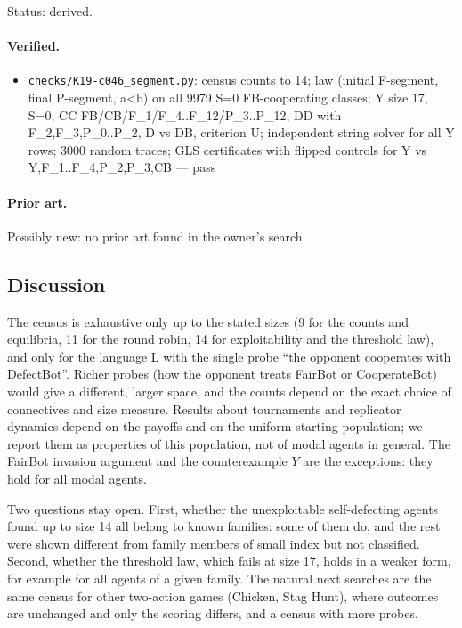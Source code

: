 \documentclass{article}
\begin{document}
Status: derived.

\paragraph{Verified.}
\begin{itemize}
\item \texttt{checks/K19-c046\_segment.py}: census counts to 14; law (initial F-segment, final P-segment, a\textless{}b) on all 9979 S=0 FB-cooperating classes; Y size 17, S=0, CC FB/CB/F\_1/F\_4..F\_12/P\_3..P\_12, DD with F\_2,F\_3,P\_0..P\_2, D vs DB, criterion U; independent string solver for all Y rows; 3000 random traces; GLS certificates with flipped controls for Y vs Y,F\_1..F\_4,P\_2,P\_3,CB --- pass
\end{itemize}

\paragraph{Prior art.} Possibly new: no prior art found in the owner's search.

\subsection*{Discussion}

The census is exhaustive only up to the stated sizes (9 for the counts and equilibria, 11 for
the round robin, 14 for exploitability and the threshold law), and only for the language L with
the single probe ``the opponent cooperates with DefectBot''. Richer probes (how the opponent
treats FairBot or CooperateBot) would give a different, larger space, and the counts depend on
the exact choice of connectives and size measure. Results about tournaments and replicator
dynamics depend on the payoffs and on the uniform starting population; we report them as
properties of this population, not of modal agents in general. The FairBot invasion argument and
the counterexample $Y$ are the exceptions: they hold for all modal agents.

Two questions stay open. First, whether the unexploitable self-defecting agents found up to size
14 all belong to known families: some of them do, and the rest were shown different from family
members of small index but not classified. Second, whether the threshold law, which fails at
size 17, holds in a weaker form, for example for all agents of a given family. The natural next
searches are the same census for other two-action games (Chicken, Stag Hunt), where outcomes are
unchanged and only the scoring differs, and a census with more probes.
\end{document}
